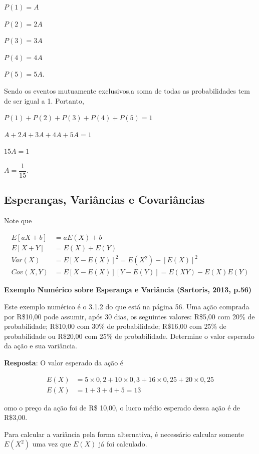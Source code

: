 \documentclass[
]{book}
\begin{document}
\(P(1)=A\)

\(P(2)=2A\)

\(P(3)=3A\)

\(P(4)=4A\)

\(P(5)=5A\).

Sendo os eventos mutuamente exclusivos,a soma de todas as probabilidades tem de ser igual a 1. Portanto,

\(P(1) + P(2) + P(3) + P(4) + P(5) = 1\)

\(A + 2A + 3A + 4A + 5A = 1\)

\(15A = 1\)

\(A = \dfrac{1}{15}\).

\hypertarget{esperanuxe7as-variuxe2ncias-e-covariuxe2ncias}{%
\subsection{Esperanças, Variâncias e Covariâncias}\label{esperanuxe7as-variuxe2ncias-e-covariuxe2ncias}}

Note que

\begin{align}
  E[aX + b] &= aE(X) + b \\
  E[X + Y] &= E(X) + E(Y) \\
  Var(X) &= E[X - E(X)]^2 = E(X^2) - [E(X)]^2 \\
  Cov(X,Y) &= E[X - E(X)][Y - E(Y)] = E(XY) - E(X)E(Y)
\end{align}

\textbf{Exemplo Numérico sobre Esperança e Variância (Sartoris, 2013, p.56)}

Este exemplo numérico é o 3.1.2 do \citet{Sartoris2013} que está na página 56.
Uma ação comprada por R\$10,00 pode assumir, após 30 dias, os seguintes valores:
R\$5,00 com 20\% de probabilidade; R\$10,00 com 30\% de probabilidade; R\$16,00 com 25\% de probabilidade ou R\$20,00 com 25\% de probabilidade. Determine o valor esperado da ação e sua variância.

\textbf{Resposta}: O valor esperado da ação é

\begin{align}
  E(X) &= 5 \times 0,2 + 10 \times 0,3 + 16 \times 0,25 + 20 \times 0,25 \\
  E(X) &= 1 + 3 + 4 + 5 = 13
\end{align}

omo o preço da ação foi de R\$ 10,00, o lucro médio esperado dessa ação é de R\$3,00.

Para calcular a variância pela forma alternativa, é necessário calcular somente \(E(X^2)\) uma vez que \(E(X)\) já foi calculado.
\end{document}
